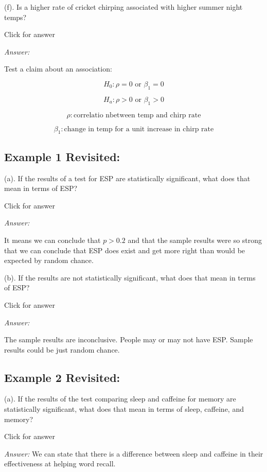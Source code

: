 \documentclass[
]{book}
\begin{document}
(f). Is a higher rate of cricket chirping associated with higher summer night temps?

Click for answer

\emph{Answer:}

Test a claim about an association:

\[H_0: \rho = 0 \text{ or } \beta_1 = 0\]

\[H_a: \rho > 0 \text{ or } \beta_1 > 0\]

\[\rho : \text{correlatio nbetween temp and chirp rate}\]

\[\beta_1 : \text{change in temp for a unit increase in chirp rate}\]

\hypertarget{example-1-revisited}{%
\subsection{Example 1 Revisited:}\label{example-1-revisited}}

(a). If the results of a test for ESP are statistically significant, what does that mean in terms of ESP?

Click for answer

\emph{Answer:}

It means we can conclude that \(p > 0.2\) and that the sample results were so strong that we can conclude that ESP does exist and get more right than would be expected by random chance.

(b). If the results are not statistically significant, what does that mean in terms of ESP?

Click for answer

\emph{Answer:}

The sample results are inconclusive. People may or may not have ESP. Sample results could be just random chance.

\hypertarget{example-2-revisited}{%
\subsection{Example 2 Revisited:}\label{example-2-revisited}}

(a). If the results of the test comparing sleep and caffeine for memory are statistically significant, what does that mean in terms of sleep, caffeine, and memory?

Click for answer

\emph{Answer:} We can state that there is a difference between sleep and caffeine in their effectiveness at helping word recall.
\end{document}
